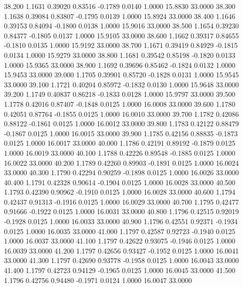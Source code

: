   38.200   1.1631   0.39020   0.83516  -0.1789   0.0140   1.0000  15.8830  33.0000
  38.300   1.1638   0.39084   0.83807  -0.1795   0.0139   1.0000  15.8924  33.0000
  38.400   1.1646   0.39153   0.84094  -0.1800   0.0138   1.0000  15.9016  33.0000
  38.500   1.1654   0.39230   0.84377  -0.1805   0.0137   1.0000  15.9105  33.0000
  38.600   1.1662   0.39317   0.84655  -0.1810   0.0135   1.0000  15.9192  33.0000
  38.700   1.1671   0.39419   0.84929  -0.1815   0.0134   1.0000  15.9279  33.0000
  38.800   1.1681   0.39542   0.85198  -0.1820   0.0133   1.0000  15.9365  33.0000
  38.900   1.1692   0.39696   0.85462  -0.1824   0.0132   1.0000  15.9453  33.0000
  39.000   1.1705   0.39901   0.85720  -0.1828   0.0131   1.0000  15.9545  33.0000
  39.100   1.1721   0.40204   0.85972  -0.1832   0.0130   1.0000  15.9648  33.0000
  39.200   1.1749   0.40837   0.86218  -0.1833   0.0128   1.0000  15.9797  33.0000
  39.500   1.1778   0.42016   0.87407  -0.1848   0.0125   1.0000  16.0008  33.0000
  39.600   1.1780   0.42051   0.87764  -0.1855   0.0125   1.0000  16.0010  33.0000
  39.700   1.1782   0.42086   0.88122  -0.1861   0.0125   1.0000  16.0012  33.0000
  39.800   1.1783   0.42122   0.88479  -0.1867   0.0125   1.0000  16.0015  33.0000
  39.900   1.1785   0.42156   0.88835  -0.1873   0.0125   1.0000  16.0017  33.0000
  40.000   1.1786   0.42191   0.89192  -0.1879   0.0125   1.0000  16.0019  33.0000
  40.100   1.1788   0.42226   0.89548  -0.1885   0.0125   1.0000  16.0022  33.0000
  40.200   1.1789   0.42260   0.89903  -0.1891   0.0125   1.0000  16.0024  33.0000
  40.300   1.1790   0.42294   0.90259  -0.1898   0.0125   1.0000  16.0026  33.0000
  40.400   1.1791   0.42328   0.90614  -0.1904   0.0125   1.0000  16.0028  33.0000
  40.500   1.1793   0.42390   0.90962  -0.1910   0.0125   1.0000  16.0028  33.0000
  40.600   1.1794   0.42437   0.91313  -0.1916   0.0125   1.0000  16.0029  33.0000
  40.700   1.1795   0.42477   0.91666  -0.1922   0.0125   1.0000  16.0031  33.0000
  40.800   1.1796   0.42515   0.92019  -0.1928   0.0125   1.0000  16.0033  33.0000
  40.900   1.1796   0.42551   0.92371  -0.1934   0.0125   1.0000  16.0035  33.0000
  41.000   1.1797   0.42587   0.92723  -0.1940   0.0125   1.0000  16.0037  33.0000
  41.100   1.1797   0.42622   0.93075  -0.1946   0.0125   1.0000  16.0039  33.0000
  41.200   1.1797   0.42656   0.93427  -0.1952   0.0125   1.0000  16.0041  33.0000
  41.300   1.1797   0.42690   0.93778  -0.1958   0.0125   1.0000  16.0043  33.0000
  41.400   1.1797   0.42723   0.94129  -0.1965   0.0125   1.0000  16.0045  33.0000
  41.500   1.1796   0.42756   0.94480  -0.1971   0.0124   1.0000  16.0047  33.0000
